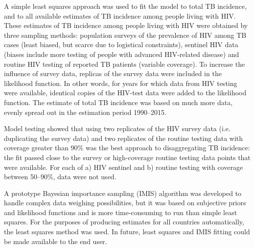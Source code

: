 A simple least squares approach was used to fit the model to total TB incidence, and to all available estimates of TB incidence among people living with HIV. These estimates of TB incidence among people living with HIV were obtained by three sampling methods: population surveys of the prevalence of HIV among TB cases (least biased, but scarce due to logistical constraints), sentinel HIV data (biases include more testing of people with advanced HIV-related disease) and routine HIV testing of reported TB patients (variable coverage). To increase the influence of survey data, replicas of the survey data were included in the likelihood function. In other words, for years for which data from HIV testing were available, identical copies of the HIV-test data were added to the likelihood function. The estimate of total TB incidence was based on much more data, evenly spread out in the estimation period 1990–2015.

Model testing showed that using two replicates of the HIV survey data (i.e. duplicating the survey data) and two replicates of the routine testing data with coverage greater than 90\% was the best approach to disaggregating TB incidence: the fit passed close to the survey or high-coverage routine testing data points that were available. For each of a) HIV sentinel and b) routine testing with coverage between 50–90\%, data were not used.

A prototype Bayesian importance sampling (IMIS) algorithm was developed to handle complex data weighing possibilities, but it was based on subjective priors and likelihood functions and is more time-consuming to run than simple least squares. For the purposes of producing estimates for all countries automatically, the least squares method was used. In future, least squares and IMIS fitting could be made available to the end user.


